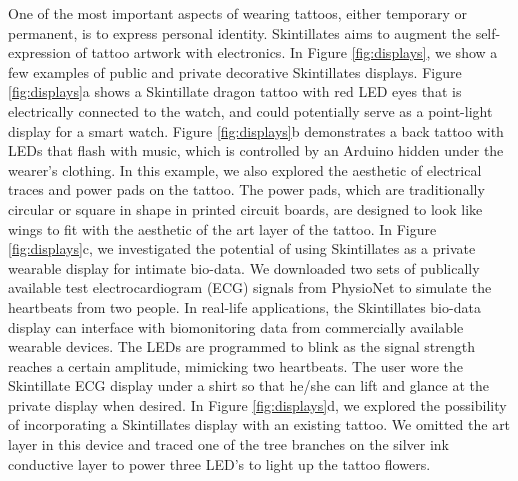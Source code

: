 \documentclass{sigchi}
\begin{document}
One of the most important aspects of wearing tattoos, either temporary or permanent, is to express personal identity. Skintillates aims to augment the self-expression of tattoo artwork with electronics. In Figure \ref{fig:displays}, we show a few examples of public and private decorative Skintillates displays. Figure \ref{fig:displays}a shows a Skintillate dragon tattoo with red LED eyes that is electrically connected to the watch, and could potentially serve as a point-light display for a smart watch. Figure \ref{fig:displays}b demonstrates a back tattoo with LEDs that flash with music, which is controlled by an Arduino hidden under the wearer's clothing.  In this example, we also explored the aesthetic of electrical traces and power pads on the tattoo. The power pads, which are traditionally circular or square in shape in printed circuit boards, are designed to look like wings to fit with the aesthetic of the art layer of the tattoo. In Figure \ref{fig:displays}c, we investigated the potential of using Skintillates as a private wearable display for intimate bio-data. We downloaded two sets of publically available test electrocardiogram (ECG) signals from PhysioNet to simulate the heartbeats from two people. In real-life applications, the Skintillates bio-data display can interface with biomonitoring data from commercially available wearable devices. The LEDs are programmed to blink as the signal strength reaches a certain amplitude, mimicking two heartbeats. The user wore the Skintillate ECG display under a shirt so that he/she can lift and glance at the private display when desired. In Figure \ref{fig:displays}d, we explored the possibility of incorporating a Skintillates display with an existing tattoo. We omitted the art layer in this device and traced one of the tree branches on the silver ink conductive layer to power three LED’s to light up the tattoo flowers.
\end{document}
